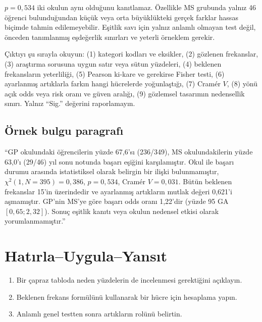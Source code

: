\begin{mistakebox}
$p=0{,}534$ iki okulun aynı olduğunu kanıtlamaz. Özellikle MS grubunda yalnız
46 öğrenci bulunduğundan küçük veya orta büyüklükteki gerçek farklar hassas
biçimde tahmin edilemeyebilir. Eşitlik savı için yalnız anlamlı olmayan test
değil, önceden tanımlanmış eşdeğerlik sınırları ve yeterli örneklem gerekir.
\end{mistakebox}

\begin{outputguidebox}
Çıktıyı şu sırayla okuyun: (1) kategori kodları ve eksikler, (2) gözlenen
frekanslar, (3) araştırma sorusuna uygun satır veya sütun yüzdeleri,
(4) beklenen frekansların yeterliliği, (5) Pearson ki-kare ve gerekirse Fisher
testi, (6) ayarlanmış artıklarla farkın hangi hücrelerde yoğunlaştığı,
(7) Cramér $V$, (8) yönü açık odds veya risk oranı ve güven aralığı,
(9) gözlemsel tasarımın nedensellik sınırı. Yalnız ``Sig.'' değerini
raporlamayın.
\end{outputguidebox}

\subsection{Örnek bulgu paragrafı}

``GP okulundaki öğrencilerin yüzde 67,6'sı (236/349), MS okulundakilerin
yüzde 63,0'ı (29/46) yıl sonu notunda başarı eşiğini karşılamıştır. Okul ile
başarı durumu arasında istatistiksel olarak belirgin bir ilişki bulunmamıştır,
$\chi^2(1,N=395)=0{,}386$, $p=0{,}534$, Cramér $V=0{,}031$. Bütün beklenen
frekanslar 15'in üzerindedir ve ayarlanmış artıkların mutlak değeri 0,621'i
aşmamıştır. GP'nin MS'ye göre başarı odds oranı 1,22'dir (yüzde 95 GA
$[0{,}65;2{,}32]$). Sonuç eşitlik kanıtı veya okulun nedensel etkisi olarak
yorumlanmamıştır.''




\section*{Hatırla--Uygula--Yansıt}

\begin{enumerate}
  \item Bir çapraz tabloda neden yüzdelerin de incelenmesi gerektiğini açıklayın.
  \item Beklenen frekans formülünü kullanarak bir hücre için hesaplama yapın.
  \item Anlamlı genel testten sonra artıkların rolünü belirtin.
\end{enumerate}